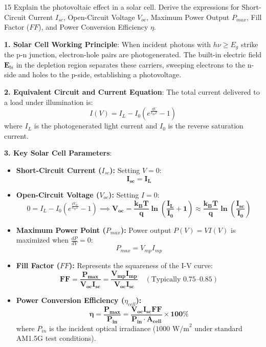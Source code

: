 \begin{theoryq}{15}
Explain the photovoltaic effect in a solar cell. Derive the expressions for Short-Circuit Current $I_{sc}$, Open-Circuit Voltage $V_{oc}$, Maximum Power Output $P_{max}$, Fill Factor ($FF$), and Power Conversion Efficiency $\eta$.
\end{theoryq}
\begin{theorysol}
\textbf{1. Solar Cell Working Principle}:
When incident photons with $h\nu \ge E_g$ strike the p-n junction, electron-hole pairs are photogenerated. The built-in electric field $\mathbf{E}_{bi}$ in the depletion region separates these carriers, sweeping electrons to the n-side and holes to the p-side, establishing a photovoltage.

\textbf{2. Equivalent Circuit and Current Equation}:
The total current delivered to a load under illumination is:
\begin{equation}
I(V) = I_L - I_0 \left(e^{\frac{qV}{k_B T}} - 1\right)
\end{equation}
where $I_L$ is the photogenerated light current and $I_0$ is the reverse saturation current.

\textbf{3. Key Solar Cell Parameters}:
\begin{itemize}
\item \textbf{Short-Circuit Current ($I_{sc}$):} Setting $V=0$:
\begin{equation}
\mathbf{I_{sc} = I_L}
\end{equation}
\item \textbf{Open-Circuit Voltage ($V_{oc}$):} Setting $I = 0$:
\begin{equation}
0 = I_L - I_0 \left(e^{\frac{qV_{oc}}{k_B T}} - 1\right) \implies \mathbf{V_{oc} = \frac{k_B T}{q} \ln\left(\frac{I_L}{I_0} + 1\right) \approx \frac{k_B T}{q}\ln\left(\frac{I_{sc}}{I_0}\right)}
\end{equation}
\item \textbf{Maximum Power Point ($P_{max}$):} Power output $P(V) = V I(V)$ is maximized when $\frac{dP}{dV} = 0$:
\begin{equation}
P_{max} = V_{mp} I_{mp}
\end{equation}
\item \textbf{Fill Factor ($FF$):} Represents the squareness of the I-V curve:
\begin{equation}
\mathbf{FF = \frac{P_{max}}{V_{oc} I_{sc}} = \frac{V_{mp} I_{mp}}{V_{oc} I_{sc}}}\quad (\text{Typically }0.75\text{--}0.85)
\end{equation}
\item \textbf{Power Conversion Efficiency ($\eta_{cell}$):}
\begin{equation}
\mathbf{\eta = \frac{P_{max}}{P_{in}} = \frac{V_{oc} I_{sc} FF}{P_{in} \cdot A_{cell}} \times 100\%}
\end{equation}
where $P_{in}$ is the incident optical irradiance ($1000\text{ W/m}^2$ under standard AM1.5G test conditions).
\end{itemize}

\end{theorysol}
\vspace{4mm}

